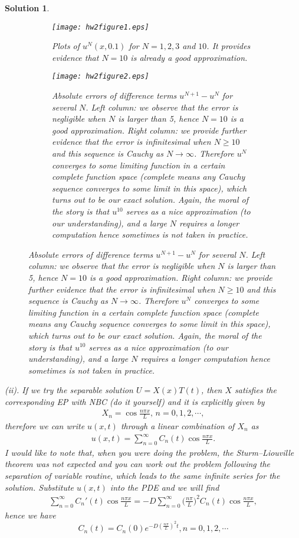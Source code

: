 \documentclass[6pt]{article}
\newtheorem{solution}{Solution}
\numberwithin{equation}{section}
\begin{document}
\begin{enumerate}
\begin{solution}
\begin{figure}[h!]%
    \centering
    \begin{subfigure}[b]{1\textwidth}
        \texttt{[image: hw2figure1.eps]}
        \caption{Plots of $u^N(x,0.1)$ for $N=1,2,3$ and $10$.  It provides evidence that $N=10$ is already a good approximation.}
    \end{subfigure}
    \begin{subfigure}[b]{1\textwidth}
        \texttt{[image: hw2figure2.eps]}
        \caption{Absolute errors of difference terms $u^{N+1}-u^N$ for several $N$.  Left column: we observe that the error is negligible when $N$ is larger than 5, hence $N=10$ is a good approximation.  Right column: we provide further evidence that the error is infinitesimal when $N\geq10$ and this sequence is Cauchy as $N\rightarrow \infty$.  Therefore $u^N$ converges to some limiting function in a certain complete function space (complete means any Cauchy sequence converges to some limit in this space), which turns out to be our exact solution.  Again, the moral of the story is that $u^{10}$ serves as a nice approximation (to our understanding), and a large $N$ requires a longer computation hence sometimes is not taken in practice.}
    \end{subfigure}
\label{figure1}
\end{figure}
(ii).  If we try the separable solution $U=X(x)T(t)$, then $X$ satisfies the corresponding EP with NBC (do it yourself) and it is explicitly given by
\begin{align*}
X_n =\cos{\frac{n\pi x}{L}}, \, n=0,1,2,\cdots,
\end{align*}
therefore we can write $u(x,t)$ through a linear combination of $X_n$ as
\begin{align*}
u(x,t)=\sum_{n=0}^{\infty}C_{n}(t)\cos{\frac{n\pi x}{L}}.
\end{align*}
I would like to note that, when you were doing the problem, the Sturm--Liouville theorem was not expected and you can work out the problem following the separation of variable routine, which leads to the same infinite series for the solution.  Substitute $u(x,t)$ into the PDE and we will find
\begin{align*}
\sum_{n=0}^{\infty}C_{n}'(t)\cos{\frac{n\pi x}{L}}=-D\sum_{n=0}^{\infty}\big(\frac{n\pi}{L}\big)^{2}C_{n}(t)\cos{\frac{n\pi x}{L}},
\end{align*}
hence we have
\[C_{n}(t)=C_{n}(0)e^{-D(\frac{n\pi}{L})^{2}t}, n=0,1,2,\cdots\]




\end{solution}
\end{enumerate}
\end{document}

